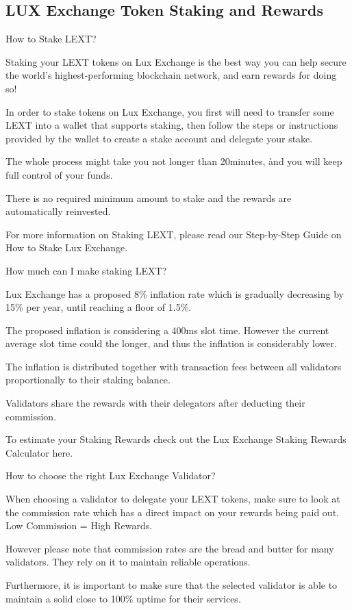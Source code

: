 \documentclass[11pt]{article}
\begin{document}
\subsection{LUX Exchange Token Staking and Rewards}

How to Stake LEXT?


Staking your LEXT tokens on Lux Exchange is the best way you can help secure the world's highest-performing blockchain network, and earn rewards for doing so!


In order to stake tokens on Lux Exchange, you first will need to transfer some LEXT into a wallet that supports staking, then follow the steps or instructions provided by the wallet to create a stake account and delegate your stake.


The whole process might take you not longer than 20minutes, ànd you will keep full control of your funds.


There is no required minimum amount to stake and the rewards are automatically reinvested.


For more information on Staking LEXT, please read our Step-by-Step Guide on How to Stake Lux Exchange.


How much can I make staking LEXT?


Lux Exchange has a proposed 8\% inflation rate which is gradually decreasing by 15\% per year, until reaching a floor of 1.5\%.


The proposed inflation is considering a 400ms slot time. However the current average slot time could the longer, and thus the inflation is considerably lower.


The inflation is distributed together with transaction fees between all validators proportionally to their staking balance.


Validators share the rewards with their delegators after deducting their commission.


To estimate your Staking Rewards check out the Lux Exchange Staking Rewards Calculator here.


How to choose the right Lux Exchange Validator?


When choosing a validator to delegate your LEXT tokens, make sure to look at the commission rate which has a direct impact on your rewards being paid out. Low Commission = High Rewards.


However please note that commission rates are the bread and butter for many validators. They rely on it to maintain reliable operations.


Furthermore, it is important to make sure that the selected validator is able to maintain a solid close to 100\% uptime for their services.
\end{document}
